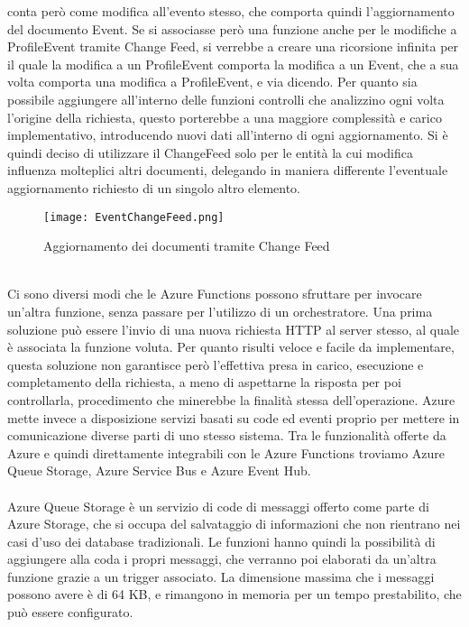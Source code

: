 conta però come modifica all'evento stesso,
che comporta quindi l'aggiornamento del documento Event.
Se si associasse però una funzione anche per le modifiche a ProfileEvent tramite Change Feed,
si verrebbe a creare una ricorsione infinita per il quale la modifica a un ProfileEvent
comporta la modifica a un Event, che a sua volta comporta una modifica a ProfileEvent, e via dicendo.
Per quanto sia possibile aggiungere all'interno delle funzioni controlli
che analizzino ogni volta l'origine della richiesta,
questo porterebbe a una maggiore complessità e carico implementativo,
introducendo nuovi dati all'interno di ogni aggiornamento.
Si è quindi deciso di utilizzare il ChangeFeed solo per le entità
la cui modifica influenza molteplici altri documenti,
delegando in maniera differente l'eventuale aggiornamento  richiesto di un singolo altro elemento.\\
\begin{figure}[htbp]
    \centering
    \texttt{[image: EventChangeFeed.png]}
    \caption{Aggiornamento dei documenti tramite Change Feed}
\end{figure}\\
Ci sono diversi modi che le Azure Functions possono sfruttare
per invocare un'altra funzione, senza passare per l'utilizzo di un orchestratore.
Una prima soluzione può essere l'invio di una nuova richiesta HTTP al server stesso,
al quale è associata la funzione voluta.
Per quanto risulti veloce e facile da implementare,
questa soluzione non garantisce però l'effettiva presa in carico, esecuzione e completamento della richiesta,
a meno di aspettarne la risposta per poi controllarla,
procedimento che minerebbe la finalità stessa dell'operazione.
Azure mette invece a disposizione servizi basati su code ed eventi
proprio per mettere in comunicazione diverse parti di uno stesso sistema.
Tra le funzionalità offerte da Azure e
quindi direttamente integrabili con le Azure Functions troviamo
Azure Queue Storage, Azure Service Bus e Azure Event Hub.\\
\\
Azure Queue Storage è un servizio di code di messaggi
offerto come parte di Azure Storage,
che si occupa del salvataggio di informazioni
che non rientrano nei casi d'uso dei database tradizionali.
Le funzioni hanno quindi la possibilità di aggiungere alla coda i propri messaggi,
che verranno poi elaborati da un'altra funzione grazie a un trigger associato.
La dimensione massima che i messaggi possono avere è di 64 KB,
e rimangono in memoria per un tempo prestabilito, che può essere configurato.
